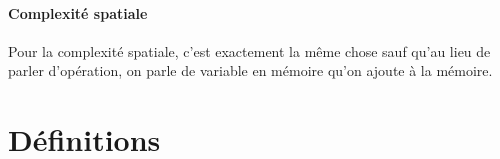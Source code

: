 \subsection{Complexité spatiale}
Pour la complexité spatiale, c'est exactement la même chose
sauf qu'au lieu de parler d'opération,
on parle de variable en mémoire qu'on ajoute à la mémoire.

\part{Définitions}
